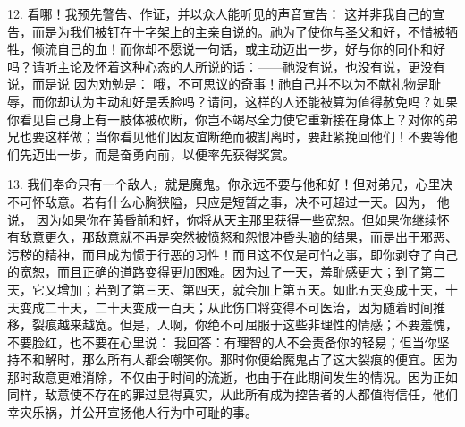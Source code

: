12. 看哪！我预先警告、作证，并以众人能听见的声音宣告： 这并非我自己的宣告，而是为我们被钉在十字架上的主亲自说的。祂为了使你与圣父和好，不惜被牺牲，倾流自己的血！而你却不愿说一句话，或主动迈出一步，好与你的同仆和好吗？请听主论及怀着这种心态的人所说的话：——祂没有说，也没有说，更没有说，而是说 因为劝勉是：  哦，不可思议的奇事！祂自己并不以为不献礼物是耻辱，而你却认为主动和好是丢脸吗？请问，这样的人还能被算为值得赦免吗？如果你看见自己身上有一肢体被砍断，你岂不竭尽全力使它重新接在身体上？对你的弟兄也要这样做；当你看见他们因友谊断绝而被割离时，要赶紧挽回他们！不要等他们先迈出一步，而是奋勇向前，以便率先获得奖赏。\par

13. 我们奉命只有一个敌人，就是魔鬼。你永远不要与他和好！但对弟兄，心里决不可怀敌意。若有什么心胸狭隘，只应是短暂之事，决不可超过一天。因为， 他说，  因为如果你在黄昏前和好，你将从天主那里获得一些宽恕。但如果你继续怀有敌意更久，那敌意就不再是突然被愤怒和怨恨冲昏头脑的结果，而是出于邪恶、污秽的精神，而且成为惯于行恶的习性！而且这不仅是可怕之事，即你剥夺了自己的宽恕，而且正确的道路变得更加困难。因为过了一天，羞耻感更大；到了第二天，它又增加；若到了第三天、第四天，就会加上第五天。如此五天变成十天，十天变成二十天，二十天变成一百天；从此伤口将变得不可医治，因为随着时间推移，裂痕越来越宽。但是，人啊，你绝不可屈服于这些非理性的情感；不要羞愧，不要脸红，也不要在心里说： 我回答：有理智的人不会责备你的轻易；但当你坚持不和解时，那么所有人都会嘲笑你。那时你便给魔鬼占了这大裂痕的便宜。因为那时敌意更难消除，不仅由于时间的流逝，也由于在此期间发生的情况。因为正如  同样，敌意使不存在的罪过显得真实，从此所有成为控告者的人都值得信任，他们幸灾乐祸，并公开宣扬他人行为中可耻的事。\par

